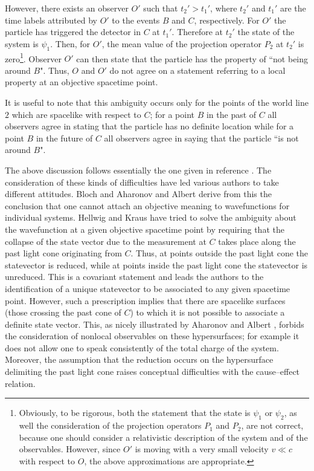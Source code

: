 \documentclass[12pt]{article}
\begin{document}
However, there exists an observer $O'$ such that $t_{2}' >
t_{1}'$, where $t_{2}'$ and $t_{1}'$ are the time labels
attributed by $O'$ to the events $B$ and $C$, respectively. For
$O'$ the particle has triggered the detector in $C$ at $t_{1}'$.
Therefore at $t_{2}'$ the state of the system is $\psi_{1}$. Then,
for $O'$, the mean value of the projection operator $P_{2}$ at
$t_{2}'$ is zero\footnote{Obviously, to be rigorous, both the
statement that the state is $\psi_{1}$ or $\psi_{2}$, as well the
consideration of the projection operators $P_{1}$ and $P_{2}$, are
not correct, because one should consider a relativistic
description of the system and of the observables. However, since
$O'$ is moving with a very small velocity $v \ll c$ with respect
to $O$, the above approximations are appropriate.}. Observer $O'$
can then state that the particle has the property of ``not being
around $B$". Thus, $O$ and $O'$ do not agree on a statement
referring to a local property at an objective spacetime point.

It is useful to note that this ambiguity occurs only for the
points of the world line $2$ which are spacelike with respect to
$C$; for a point $B$ in the past of $C$ all observers agree in
stating that the particle has no definite location while for a
point $B$ in the future of $C$ all observers agree in saying that
the particle ``is not around $B$".

The above discussion follows essentially the one given in
reference \cite{bl1}. The consideration of these kinds of
difficulties have led various authors to take different attitudes.
Bloch \cite{bl1} and Aharonov and Albert \cite{aa1} derive from
this the conclusion that one cannot attach an objective meaning to
wavefunctions for individual systems. Hellwig and Kraus \cite{hkd}
have tried to solve the ambiguity about the wavefunction at a
given objective spacetime point by requiring that the collapse of
the state vector due to the measurement at $C$ takes place along the past
light cone originating from $C$. Thus, at points outside the past light
cone the statevector is reduced, while at points inside the past light
cone the statevector is unreduced. This is a covariant statement and leads
the authors to the identification of a unique statevector to be
associated to any given spacetime point. However, such a
prescription implies that there are spacelike surfaces (those
crossing the past cone of $C$) to which it is not possible to
associate a definite state vector. This, as nicely illustrated by
Aharonov and Albert \cite{aa1}, forbids the consideration of
nonlocal observables on these hypersurfaces; for example it does
not allow one to speak consistently of the total charge of the
system. Moreover, the assumption that the reduction occurs on the
hypersurface delimiting the past light cone raises conceptual
difficulties with the cause--effect relation.
\end{document}

